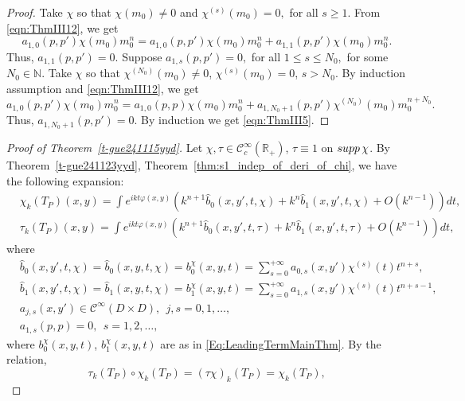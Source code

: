 \documentclass[12pt]{amsart}
\theoremstyle{definition}
\theoremstyle{named}
\numberwithin{equation}{subsection}
\newcommand{\N}{\mathbb{N}}
\def\cC{\mathscr{C}}
\begin{document}
\begin{proof}
    Take $\chi$ so that $\chi(m_0)\neq 0$ and $\chi^{(s)}(m_0)=0,$ for all $s\geq 1.$ From \eqref{eqn:ThmIII12}, we get 
    $$a_{1,0}(p,p')\chi(m_0)m_0^n=a_{1,0}(p,p')\chi(m_0)m_0^n+a_{1,1}(p,p')\chi(m_0)m_0^n.$$ Thus, $a_{1,1}(p,p')=0.$
    Suppose $a_{1,s}(p,p')=0,$ for all $1\leq s\leq N_0,$ for some $N_0\in\N.$ Take $\chi$ so that $\chi^{(N_0)}(m_0)\neq 0$, $\chi^{(s)}(m_0)=0$, $s>N_0.$ By induction assumption and \eqref{eqn:ThmIII12}, we get 
    $$a_{1,0}(p,p')\chi(m_0)m_0^n=a_{1,0}(p,p)\chi(m_0)m_0^n+a_{1,N_0+1}(p,p')\chi^{(N_0)}(m_0)m_0^{n+N_0}.$$
    Thus, $a_{1,N_0+1}(p,p')=0.$ By induction we get \eqref{eqn:ThmIII5}.
\end{proof}

\begin{proof}[Proof of Theorem~\ref{t-gue241115yyd}]
Let $\chi, \tau\in\cC^\infty_c(\mathbb R_+)$, $\tau\equiv1$ on ${\rm supp\,}\chi$. By Theorem~\ref{t-gue241123yyd}, Theorem~\ref{thm:s1_indep_of_deri_of_chi}, we have the following expansion:
\begin{equation}\label{eqn:chiktp}
\begin{split}
    &\chi_k(T_P)(x,y)=\int e^{ikt\varphi(x,y)}\left(k^{n+1}\hat b_0(x,y',t,\chi)+k^n\hat b_1(x,y',t,\chi)+O(k^{n-1})\right)dt,\\
    &\tau_k(T_P)(x,y)=\int e^{ikt\varphi(x,y)}\left(k^{n+1}\hat b_0(x,y',t,\tau)+k^n\hat b_1(x,y',t,\tau)+O(k^{n-1})\right)dt,
\end{split}
\end{equation}
where
    \begin{equation}\label{e-gue241206ycd}
    \begin{split}
     &\hat b_0(x,y',t,\chi)=\hat b_0(x,y,t,\chi)=b^\chi_0(x,y,t)=\sum^{+\infty}_{s=0}a_{0,s}(x,y')\chi^{(s)}(t)t^{n+s},\\
        &\hat b_1(x,y',t,\chi)=\hat b_1(x,y,t,\chi)=b^\chi_1(x,y,t)=\sum^{+\infty}_{s=0}a_{1,s}(x,y')\chi^{(s)}(t)t^{n+s-1},\\
     &a_{j,s}(x,y')\in\cC^\infty(D\times D),\ \ j,s=0,1,\ldots,\\
     &a_{1,s}(p,p)=0,\ \ s=1,2,\ldots, 
     \end{split}
    \end{equation}
    where $b^\chi_0(x,y,t)$, $b^\chi_1(x,y,t)$ are as in \eqref{Eq:LeadingTermMainThm}. 
    By the relation, 
\begin{equation}\label{eqn:relation tauchi=chi}
    \tau_k(T_P)\circ\chi_k(T_P)=(\tau\chi)_k(T_P)=\chi_k(T_P),
\end{equation}

\end{proof}
\end{document}
